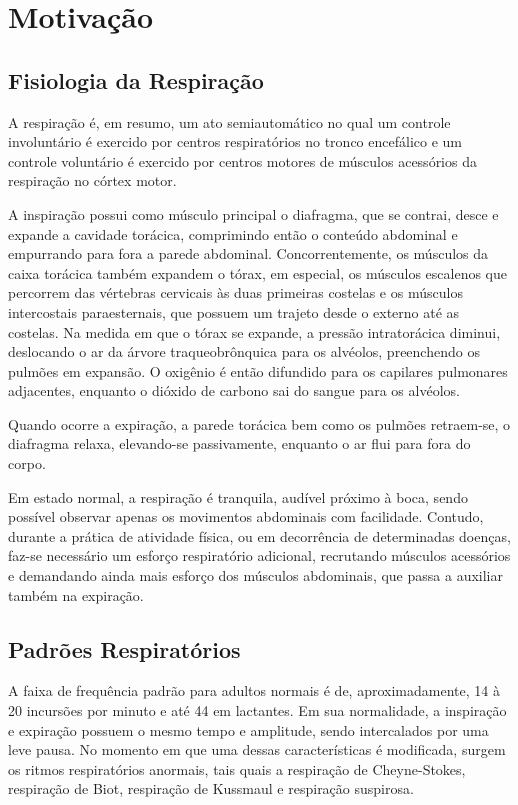 \chapter{Motivação}
  
\section{Fisiologia da Respiração} \label{sec:fisiologiadarespiracao}

	A respiração é, em resumo, um ato semiautomático no qual um controle involuntário é exercido por centros respiratórios no tronco encefálico e um controle voluntário é exercido por centros motores de músculos acessórios da respiração no córtex motor.
	
	A inspiração possui como músculo principal o diafragma, que se contrai, desce e expande a cavidade torácica, comprimindo então o conteúdo abdominal e empurrando para fora a parede abdominal. Concorrentemente, os músculos da caixa torácica também expandem o tórax, em especial, os músculos escalenos que percorrem das vértebras cervicais às duas primeiras costelas e os músculos intercostais paraesternais, que possuem um trajeto desde o externo até as costelas. Na medida em que o tórax se expande, a pressão intratorácica diminui, deslocando o ar da árvore traqueobrônquica para os alvéolos, preenchendo os pulmões em expansão. O oxigênio é então difundido para os capilares pulmonares adjacentes, enquanto o dióxido de carbono sai do sangue para os alvéolos.
	
	Quando ocorre a expiração, a parede torácica bem como os pulmões retraem-se, o diafragma relaxa, elevando-se passivamente, enquanto o ar flui para fora do corpo.
	
	Em estado normal, a respiração é tranquila, audível próximo à boca, sendo possível observar apenas os movimentos abdominais com facilidade. Contudo, durante a prática de atividade física, ou em decorrência de determinadas doenças, faz-se necessário um esforço respiratório adicional, recrutando músculos acessórios e demandando ainda mais esforço dos músculos abdominais, que passa a auxiliar também na expiração.
	
\section{Padrões Respiratórios} \label{sec:padroesrespiratorios}

	A faixa de frequência padrão para adultos normais é de, aproximadamente, 14 à 20 incursões por minuto e até 44 em lactantes. Em sua normalidade, a inspiração e expiração possuem o mesmo tempo e amplitude, sendo intercalados por uma leve pausa. No momento em que uma dessas características é modificada, surgem os ritmos respiratórios anormais, tais quais a respiração de Cheyne-Stokes, respiração de Biot, respiração de Kussmaul e respiração suspirosa.
	
